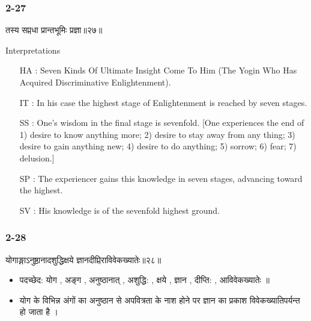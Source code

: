 \begin{frame}[fragile]\frametitle{2-27}
\begin{sanskrit}
तस्य सप्तधा प्रान्तभूमिः प्रज्ञा॥२७॥
\end{sanskrit}

Interpretations
\begin{itemize}
\item [HA]: Seven Kinds Of Ultimate Insight Come To Him (The Yogin Who Has Acquired Discriminative Enlightenment).
\item [IT]: In his case the highest stage of Enlightenment is reached by seven stages.
\item [SS]: One’s wisdom in the final stage is sevenfold. [One experiences the end of 1) desire to know anything more; 2) desire to stay away from any thing; 3) desire to gain anything new; 4) desire to do anything; 5) sorrow; 6) fear; 7) delusion.]
\item [SP]: The experiencer gains this knowledge in seven stages, advancing toward the highest.
\item [SV]: His knowledge is of the sevenfold highest ground. 
\end{itemize}
	
\end{frame}

\begin{frame}[fragile]\frametitle{2-28}
\begin{sanskrit}
योगाङ्गाऽनुष्ठानादशुद्धिक्षये ज्ञानदीप्तिराविवेकख्यातेः॥२८॥
\end{sanskrit}

\begin{itemize}
\item पदच्छेद: योग , अङ्ग , अनुष्ठानात् , अशुद्धि: , क्षये , ज्ञान , दीप्ति: , आविवेकख्यातेः ॥
\item योग के विभिन्न अंगों का अनुष्ठान से अपवित्रता के नाश होने पर ज्ञान का प्रकाश विवेकख्यातिपर्यन्त हो जाता है ।
\end{itemize}
	
\end{frame}

